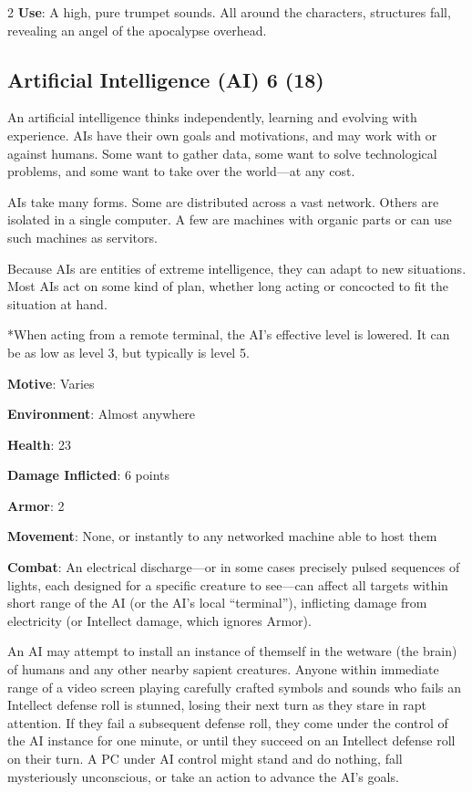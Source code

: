 \begin{multicols}{2}
\textbf{Use}: A high, pure trumpet sounds. All around the characters, structures fall, revealing an angel of the apocalypse overhead.

\subsection{Artificial Intelligence (AI) 6 (18)}

An artificial intelligence thinks independently, learning and evolving with experience. AIs have their own goals and motivations, and may work with or against humans. Some want to gather data, some want to solve technological problems, and some want to take over the world—at any cost. 

AIs take many forms. Some are distributed across a vast network. Others are isolated in a single computer. A few are machines with organic parts or can use such machines as servitors. 

Because AIs are entities of extreme intelligence, they can adapt to new situations. Most AIs act on some kind of plan, whether long acting or concocted to fit the situation at hand.

*When acting from a remote terminal, the AI’s effective level is lowered. It can be as low as level 3, but typically is level 5. 

\textbf{Motive}: Varies 

\textbf{Environment}: Almost anywhere 

\textbf{Health}: 23 

\textbf{Damage Inflicted}: 6 points 

\textbf{Armor}: 2 

\textbf{Movement}: None, or instantly to any networked machine able to host them 

\textbf{Combat}: An electrical discharge—or in some cases precisely pulsed sequences of lights, each designed for a specific creature to see—can affect all targets within short range of the AI (or the AI’s local “terminal”), inflicting damage from electricity (or Intellect damage, which ignores Armor). 

An AI may attempt to install an instance of themself in the wetware (the brain) of humans and any other nearby sapient creatures. Anyone within immediate range of a video screen playing carefully crafted symbols and sounds who fails an Intellect defense roll is stunned, losing their next turn as they stare in rapt attention. If they fail a subsequent defense roll, they come under the control of the AI instance for one minute, or until they succeed on an Intellect defense roll on their turn. A PC under AI control might stand and do nothing, fall mysteriously unconscious, or take an action to advance the AI’s goals. 


\end{multicols}
